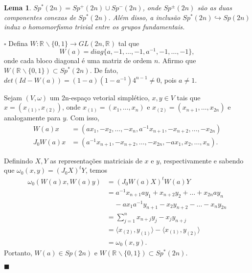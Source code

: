\documentclass[12pt]{book}
\newtheorem{lema}[teorema]{Lema}
\newenvironment{prova}[1]{$\square$ #1}{\hfill$\blacksquare$}
\newcommand{\complementar}[2]{#1 \backslash #2}
\newcommand{\estruturacomplexa}{J_{0}}
\newcommand{\formaSimpleticaPadrao}[2]{\omega_{0}(#1, #2)}
\newcommand{\generalgroup}[2]{GL(#1, #2)}
\newcommand{\generalgroupreal}[1]{\generalgroup{#1}{\real{}}}
\newcommand{\gruposimpletico}[1]{Sp(#1)}
\newcommand{\gruposimpleticonaodegenerado}[1]{Sp^{#1}(2n)}
\newcommand{\produtointerno}[2]{\langle #1, #2 \rangle}
\newcommand{\real}[1]{\mathbb{R}^{#1}}
\newcommand{\reta}{\real{}}
\begin{document}
	\begin{lema}
		$\gruposimpleticonaodegenerado{*} = \gruposimpleticonaodegenerado{+}\cup \gruposimpleticonaodegenerado{-}$, onde $\gruposimpleticonaodegenerado{\pm}$ são as duas componentes conexas de $\gruposimpleticonaodegenerado{*}$. Além disso, a inclusão $\gruposimpleticonaodegenerado{*} \hookrightarrow \gruposimpletico{2n}$ induz o homomorfismo trivial entre os grupos fundamentais.
	\end{lema}
	\begin{prova}
		Defina $W: \complementar{\reta}{\{0,1\}} \to \generalgroupreal{2n}$ tal que 
		$$
		W(a) = diag\{a, -1, \dots, -1, a^{-1}, -1, \dots , -1\},
		$$
		onde cada bloco diagonal é uma matriz de ordem $n$. Afirmo que $W(\complementar{\reta}{\{0,1\}}) \subset \gruposimpleticonaodegenerado{*}$. De fato, $det(Id - W(a)) = (1-a)(1-a^{-1})4^{n-1} \neq 0$, pois $a\neq 1$.
		
		Sejam $(V, \omega)$ um 2n-espaço vetorial simplético, $x,y \in V$ tais que $x=(x_{(1)}, x_{(2)})$, onde $x_{(1)} = (x_{1}, \dots, x_{n})$ e $x_{(2)} = (x_{n+1}, \dots, x_{2n})$ e analogamente para $y$. Com isso, 
		$$
		\begin{aligned}	
		W(a)x &= (ax_{1}, -x_{2}, \dots, -x_{n}, a^{-1}x_{n+1}, -x_{n+2}, \dots, -x_{2n})
		\\
		\estruturacomplexa W(a)x &= (a^{-1}x_{n+1}, -x_{n+2}, \dots, -x_{2n}, -ax_{1}, x_{2}, \dots, x_{n}).
		\end{aligned}
		$$ 
		
		Definindo $X, Y$ as representações matriciais de $x$ e $y$, respectivamente e sabendo que $\formaSimpleticaPadrao{x}{y} = (\estruturacomplexa X)^{t}Y$, temos
		$$
		\begin{aligned}
			\formaSimpleticaPadrao{W(a)x}{W(a)y} 
			&=
			(\estruturacomplexa W(a)X)^{t}W(a)Y
			\\
			&=a^{-1} x_{n+1}ay_{1} + x_{n+2}y_{2}+ \dots + x_{2n}ay_{n}
			\\
			& \;\;\;\; -ax_{1}a^{-1}y_{n+1}- x_{2}y_{n+2}-\dots - x_{n}y_{2n} 
			\\
			&=\sum_{j=1}^{n}x_{n+j}y_{j} - 	x_{j}y_{n+j}
			\\
			&= \produtointerno{x_{(2)}}{y_{(1)}} - \produtointerno{x_{(1)}}{y_{(2)}}
			\\
			&= \formaSimpleticaPadrao{x}{y}.
		\end{aligned}
		$$
		Portanto, $W(a) \in \gruposimpletico{2n}$ e $W(\complementar{\reta}{\{0,1\}}) \subset \gruposimpleticonaodegenerado{*}$.
		

\end{prova}
\end{document}
